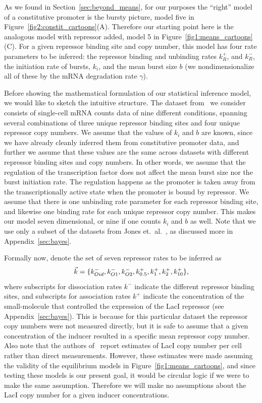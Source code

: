 As we found in Section~\ref{sec:beyond_means}, for our purposes the ``right''
model of a constitutive promoter is the bursty picture, model five in
Figure~\ref{fig2:constit_cartoons}(A). Therefore our starting point here is the
analogous model with repressor added, model 5 in
Figure~\ref{fig1:means_cartoons}(C). For a given repressor binding site and copy
number, this model has four rate parameters to be inferred: the repressor
binding and unbinding rates $k_R^+$, and $k_R^-$, the initiation rate of bursts,
$k_i$, and the mean burst size $b$ (we nondimensionalize all of these by the
mRNA degradation rate $\gamma$).

Before showing the mathematical formulation of our statistical inference model,
we would like to sketch the intuitive structure. The dataset
from~\cite{Jones2014} we consider consists of single-cell mRNA counts data of
nine different conditions, spanning several combinations of three unique
repressor binding sites and four unique repressor copy numbers. We assume that
the values of $k_i$ and $b$ are known, since we have already cleanly inferred
them from constitutive promoter data, and further we assume that these values
are the same across datasets with different repressor binding sites and copy
numbers. In other words, we assume that the regulation of the transcription
factor does not affect the mean burst size nor the burst initiation rate. The
regulation happens as the promoter is taken away from the transcriptionally
active state when the promoter is bound by repressor. We assume that there is
one unbinding rate parameter for each repressor binding site, and likewise one
binding rate for each unique repressor copy number. This makes our model seven
dimensional, or nine if one counts $k_i$ and $b$ as well. Note that we use only
a subset of the datasets from Jones et.\ al.~\cite{Jones2014}, as discussed more
in Appendix~\ref{sec:bayes}.

Formally now, denote the set of seven repressor rates to be inferred as
\begin{equation}
\vec{k} =\{k_{Oid}^-, k_{O1}^-, k_{O2}^-,
k_{0.5}^+, k_{1}^+, k_{2}^+, k_{10}^+\},
\end{equation}
where subscripts for dissociation rates $k^-$  indicate the different repressor
binding sites, and subscripts for association rates $k^+$ indicate the
concentration of the small-molecule that controlled the expression of the LacI
repressor (see Appendix~\ref{sec:bayes}). This is because for this particular
dataset the repressor copy numbers were not measured directly, but it is safe to
assume that a given concentration of the inducer resulted in a specific mean
repressor copy number\cite{Chure2019a}. Also note that the authors
of~\cite{Jones2014} report estimates of LacI copy number per cell rather than
direct measurements. However, these estimates were made assuming the validity of
the equilibrium models in Figure~\ref{fig1:means_cartoons}, and since testing
these models is our present goal, it would be circular logic if we were to make
the same assumption. Therefore we will make no assumptions about the LacI copy
number for a given inducer concentrations.

